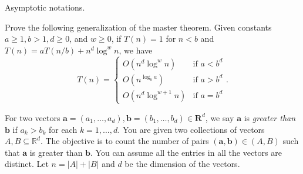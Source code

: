 \documentclass{oxmathproblems}
\begin{document}
\begin{questions}
\miquestion[25]
Asymptotic notations.

\miquestion[25]
Prove the following generalization of the master theorem. Given constants $a\geq 1,b> 1,d\geq 0$, and $w\geq 0$, if $T(n)=1$ for $n<b$ and $T(n) = aT(n/b) + n^d\log^w n$, we have
  $$
    T(n) = \begin{cases}
      O(n^d\log^w n) & \mbox{if }a < b^d \\
      O(n^{\log_b a}) & \mbox{if }a > b^d \\
      O(n^d\log^{w+1} n) & \mbox{if }a = b^d
    \end{cases}.
  $$

\miquestion[25]
For two vectors $\mathbf{a}=(a_1,\ldots,a_d),\mathbf{b}=(b_1,\ldots,b_d)\in\mathbf{R}^d$, we say $\mathbf{a}$ is \emph{greater than} $\mathbf{b}$ if $a_k>b_k$ for each $k=1,\ldots,d$.
You are given two collections of vectors $A,B\subseteq\mathbb{R}^d$.
The objective is to count the number of pairs $(\mathbf{a},\mathbf{b})\in(A,B)$ such that $\mathbf{a}$ is greater than $\mathbf{b}$.
You can assume all the entries in all the vectors are distinct.
Let $n=|A|+|B|$ and $d$ be the dimension of the vectors.


\end{questions}
\end{document}
